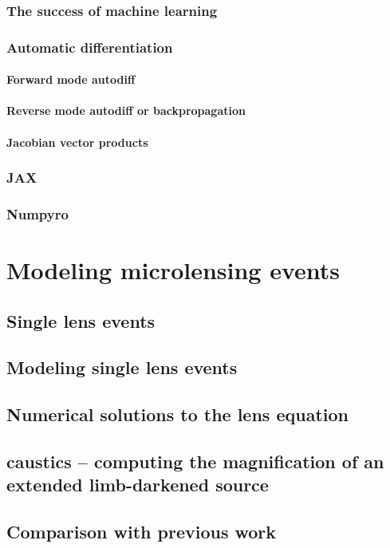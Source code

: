 \documentclass[11pt]{report}
\begin{document}
\subsection{The success of machine learning}
\subsection{Automatic differentiation}
\subsubsection{Forward mode autodiff}
\subsubsection{Reverse mode autodiff or backpropagation}
\subsubsection{Jacobian vector products}
\subsection{JAX}
\subsection{Numpyro}

\chapter{Modeling microlensing events}
\label{ch:microlensing}
\section{Single lens events}
\section{Modeling single lens events}
\section{Numerical solutions to the lens equation}
\section{\textsf{caustics} -- computing the magnification of an extended limb-darkened source}
\section{Comparison with previous work}
\end{document}
